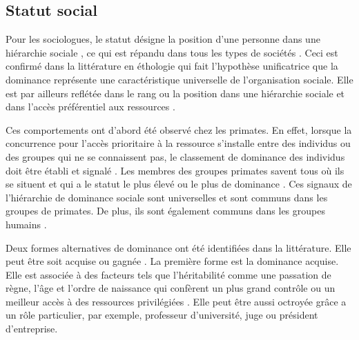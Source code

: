 \subsection{Statut social}

	 Pour les sociologues, le statut désigne la position d'une personne dans une hiérarchie sociale \cite{ellyson1985power}, ce qui est répandu dans tous les types de sociétés \cite{lips1991women}.
	Ceci est confirmé  dans la littérature en éthologie qui fait l'hypothèse unificatrice que la dominance représente une caractéristique universelle de l'organisation sociale. Elle est par ailleurs reflétée dans le rang ou la position dans une hiérarchie sociale \cite{burgoon1998nature} et dans l'accès préférentiel aux ressources \cite{liska1990dominance}.
	
	Ces comportements ont d'abord été observé chez les primates. En effet, lorsque la concurrence pour l'accès prioritaire à la ressource s'installe entre des individus ou des groupes qui ne se connaissent pas, le classement de dominance des individus doit être établi et signalé \cite{burgoon1998nature}. Les membres des groupes primates savent tous où ils se situent et qui a le statut le plus élevé ou le plus de dominance \cite{smither1993authoritarianism}.
	Ces signaux de l'hiérarchie de dominance sociale sont universelles et sont communs dans les groupes de primates. De plus, ils sont également communs dans les groupes humains \cite{burgoon1998nature}.
	
	Deux formes alternatives de dominance ont été identifiées dans la littérature. Elle peut être soit acquise ou gagnée \cite{liska1990dominance}.
	La première forme est la dominance acquise. Elle est associée à des facteurs tels que l'héritabilité comme une passation de règne, l'âge et l'ordre de naissance qui confèrent un plus grand contrôle ou un meilleur accès à des ressources privilégiées \cite{cattell1970handbook}. Elle peut être aussi octroyée grâce a un rôle particulier, par exemple, professeur d'université, juge ou président d'entreprise.
	

